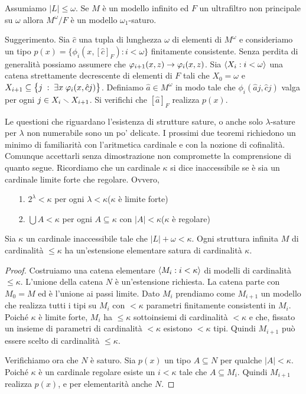 \begin{exercise}
Assumiamo $|L|\le\omega$. Se $M$ \`e un modello infinito ed $F$ un ultrafiltro non principale su $\omega$ allora $M^\omega/F$ \`e un modello $\omega_1$-saturo.

Suggerimento. Sia $\hat c$ una tupla di lunghezza $\omega$ di elementi di $M^\omega$ e consideriamo un tipo $p(x)=\big\{\phi_i(x,[\hat c]_F):i<\omega\big\}$ finitamente consistente. Senza perdita di generalit\`a possiamo assumere che $\varphi_{i+1}(x,z)\rightarrow\varphi_i(x,z)$. Sia  $\langle X_i:i<\omega\rangle$ una catena strettamente decrescente di elementi di $F$ tali che $X_0=\omega$ e $X_{i+1}\subseteq\big\{j\;:\;\exists x\;\varphi_i(x,\hat cj)\big\}$. Definiamo $\hat a\in M^\omega$ in modo tale che $\phi_i(\hat aj,\hat cj)$ valga per ogni $j\in X_i\smallsetminus X_{i+1}$. Si verifichi che $[\hat a]_F$ realizza $p(x)$.\QED
\end{exercise}

Le questioni che riguardano l'esistenza di strutture sature, o anche solo $\lambda$-sature per $\lambda$ non numerabile sono un po' delicate. I prossimi due teoremi richiedono un minimo di familiarit\`a con l'aritmetica cardinale e con la nozione di cofinalit\`a. Comunque accettarli senza dimostrazione non compromette la comprensione di quanto segue. Ricordiamo che un cardinale $\kappa$ si dice inaccessibile se \`e sia un cardinale limite forte che regolare. Ovvero,
\begin{itemize} 
 \item[1.] $2^\lambda<\kappa$ per ogni $\lambda<\kappa$\hfill ($\kappa$ \`e limite forte)
 \item[2.] $\bigcup A<\kappa$ per ogni $A\subseteq\kappa$ con $|A|<\kappa$\hfill ($\kappa$ \`e regolare)
\end{itemize}

\begin{theorem}\label{thm_esistenza_staturo_card_inacc}
Sia $\kappa$ un cardinale inaccessibile tale che $|L|+\omega<\kappa$. Ogni struttura infinita $M$ di cardinalit\`a $\le\kappa$ ha un'estensione elementare satura di cardinalit\`a $\kappa$.
\end{theorem}

\begin{proof}
Costruiamo una catena elementare $\langle M_i : i<\kappa\rangle$ di modelli di cardinalit\`a $\le\kappa$. L'unione della catena $N$ \`e un'estensione richiesta. La catena parte con $M_0=M$ ed \`e l'unione ai passi limite. Dato $M_i$ prendiamo come $M_{i+1}$ un modello che realizza tutti i tipi su $M_i$ con $<\kappa$ parametri finitamente consistenti in $M_i$. Poich\'e $\kappa$ \`e limite forte,  $M_i$ ha $\le\kappa$ sottoinsiemi di cardinalit\`a $<\kappa$ e che, fissato un insieme di parametri di cardinalit\`a $<\kappa$ esistono $<\kappa$ tipi. Quindi $M_{i+1}$ pu\`o essere scelto di cardinalit\`a $\le\kappa$.

Verifichiamo ora che $N$ \`e saturo. Sia $p(x)$ un tipo $A\subseteq N$ per qualche $|A|<\kappa$. Poich\'e $\kappa$ \`e un cardinale regolare esiste un $i<\kappa$ tale che $A\subseteq M_i$. Quindi $M_{i+1}$ realizza $p(x)$, e per elementarit\`a anche $N$.
\end{proof}

